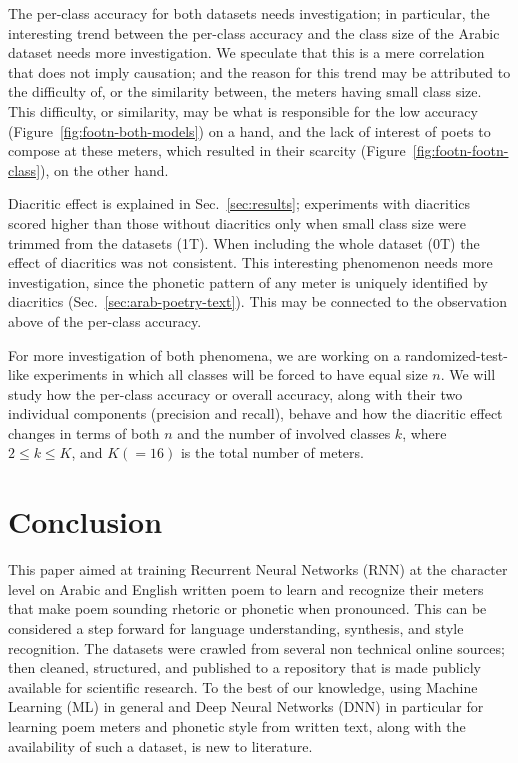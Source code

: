 \documentclass[journal,10pt,twocolumns,letter]{IEEEtran}
\begin{document}
\bigskip

The per-class accuracy for both datasets needs investigation; in particular, the interesting trend
between the per-class accuracy and the class size of the Arabic dataset needs more investigation. We
speculate that this is a mere correlation that does not imply causation; and the reason for this
trend may be attributed to the difficulty of, or the similarity between, the meters having small
class size. This difficulty, or similarity, may be what is responsible for the low accuracy
(Figure~\ref{fig:footn-both-models}) on a hand, and the lack of interest of poets to compose at
these meters, which resulted in their scarcity (Figure~\ref{fig:footn-footn-class}), on the other
hand.

Diacritic effect is explained in Sec.~\ref{sec:results}; experiments with diacritics scored higher
than those without diacritics only when small class size were trimmed from the datasets (1T). When
including the whole dataset (0T) the effect of diacritics was not consistent. This interesting
phenomenon needs more investigation, since the phonetic pattern of any meter is uniquely identified
by diacritics (Sec.~\ref{sec:arab-poetry-text}). This may be connected to the observation above of
the per-class accuracy.


For more investigation of both phenomena, we are working on a randomized-test-like experiments in
which all classes will be forced to have equal size $n$. We will study how the per-class accuracy or
overall accuracy, along with their two individual components (precision and recall), behave and how
the diacritic effect changes in terms of both $n$ and the number of involved classes $k$, where
$2 \leq k \leq K$, and $K(=16)$ is the total number of meters.







\section{Conclusion}\label{sec:conclusion}
This paper aimed at training Recurrent Neural Networks (RNN) at the character level on Arabic and
English written poem to learn and recognize their meters that make poem sounding rhetoric or
phonetic when pronounced. This can be considered a step forward for language understanding,
synthesis, and style recognition. The datasets were crawled from several non technical online
sources; then cleaned, structured, and published to a repository that is made publicly available for
scientific research. To the best of our knowledge, using Machine Learning (ML) in general and Deep
Neural Networks (DNN) in particular for learning poem meters and phonetic style from written text,
along with the availability of such a dataset, is new to literature.
\end{document}
